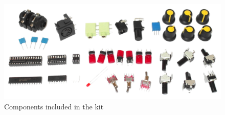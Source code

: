 \documentclass{scrartcl}
\begin{document}
\begin{figure}[!ht]
    \begin{center}
        \includegraphics[scale=0.32]{assets/zekit-content.jpg}
        \caption{Components included in the kit}
    \end{center}
\end{figure}

\vspace{0.25cm}
\end{document}
